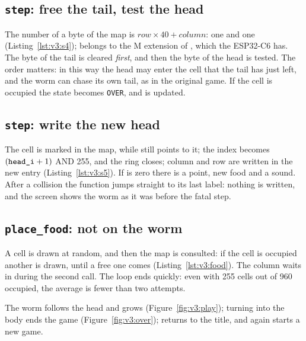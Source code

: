 \subsection{\texttt{step}: free the tail, test the head}


The number of a byte of the map is $\mathit{row}\times 40+\mathit{column}$:
one  and one  (Listing~\ref{lst:v3:s4});  belongs
to the M extension of \riscv, which the ESP32-C6 has. The byte of the tail
is cleared \emph{first}, and then the byte of the head is tested. The order
matters: in this way the head may enter the cell that the tail has just left,
and the worm can chase its own tail, as in the original game. If the cell is
occupied the state becomes \texttt{OVER}, and  is updated.

\subsection{\texttt{step}: write the new head}


The cell is marked in the map, while  still points to it; the index
 becomes $(\texttt{head\_i}+1)$ AND 255, and the ring closes;
column and row are written in the new entry (Listing~\ref{lst:v3:s5}). If
 is zero there is a point, new food and a sound. After a collision
the function jumps straight to its last label: nothing is written, and the
screen shows the worm as it was before the fatal step.

\subsection{\texttt{place\_food}: not on the worm}


A cell is drawn at random, and then the map is consulted: if the cell is
occupied another is drawn, until a free one comes
(Listing~\ref{lst:v3:food}). The column waits in  during the second
call. The loop ends quickly: even with 255 cells out of 960 occupied, the
average is fewer than two attempts.

\begin{prgcheck}
The worm follows the head and grows (Figure~\ref{fig:v3:play}); turning into
the body ends the game (Figure~\ref{fig:v3:over});  returns to the
title, and  again starts a new game.
\end{prgcheck}

